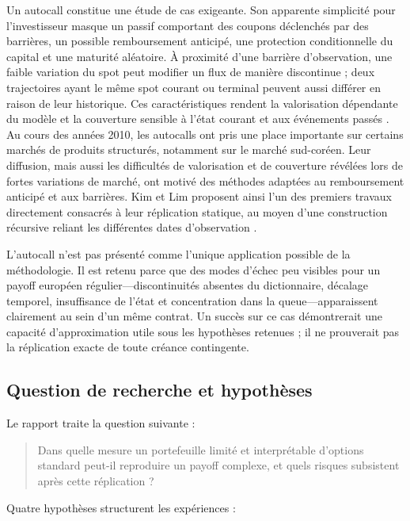 \documentclass[12pt,a4paper]{article}
\newcommand{\1}{\mathbf{1}}
\begin{document}
Un autocall constitue une étude de cas exigeante. Son apparente simplicité pour l'investisseur masque un passif comportant des coupons déclenchés par des barrières, un possible remboursement anticipé, une protection conditionnelle du capital et une maturité aléatoire. À proximité d'une barrière d'observation, une faible variation du spot peut modifier un flux de manière discontinue ; deux trajectoires ayant le même spot courant ou terminal peuvent aussi différer en raison de leur historique. Ces caractéristiques rendent la valorisation dépendante du modèle et la couverture sensible à l'état courant et aux événements passés \cite{guillaume2015}. Au cours des années 2010, les autocalls ont pris une place importante sur certains marchés de produits structurés, notamment sur le marché sud-coréen. Leur diffusion, mais aussi les difficultés de valorisation et de couverture révélées lors de fortes variations de marché, ont motivé des méthodes adaptées au remboursement anticipé et aux barrières. Kim et Lim proposent ainsi l'un des premiers travaux directement consacrés à leur réplication statique, au moyen d'une construction récursive reliant les différentes dates d'observation \cite{kimlim2019}.

L'autocall n'est pas présenté comme l'unique application possible de la méthodologie. Il est retenu parce que des modes d'échec peu visibles pour un payoff européen régulier---discontinuités absentes du dictionnaire, décalage temporel, insuffisance de l'état et concentration dans la queue---apparaissent clairement au sein d'un même contrat. Un succès sur ce cas démontrerait une capacité d'approximation utile sous les hypothèses retenues ; il ne prouverait pas la réplication exacte de toute créance contingente.

\subsection{Question de recherche et hypothèses}

Le rapport traite la question suivante :

\begin{quote}
Dans quelle mesure un portefeuille limité et interprétable d'options standard peut-il reproduire un payoff complexe, et quels risques subsistent après cette réplication ?
\end{quote}

Quatre hypothèses structurent les expériences :
\end{document}
